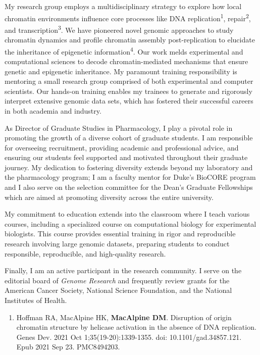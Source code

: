 \documentclass{update_nihbiosketch}
\begin{document}
\begin{statement}
\addtolength{\parskip}{1.5mm}
\noindent My research group employs a multidisciplinary strategy to explore how local chromatin environments influence core processes like DNA replication\textsuperscript{1}, repair\textsuperscript{2}, and transcription\textsuperscript{3}. We have pioneered novel genomic approaches to study chromatin dynamics and profile chromatin assembly post-replication to elucidate the inheritance of epigenetic information\textsuperscript{4}. Our work melds experimental and computational sciences to decode chromatin-mediated mechanisms that ensure genetic and epigenetic inheritance. My paramount training responsibility is mentoring a small research group comprised of both experimental and computer scientists. Our hands-on training enables my trainees to generate and rigorously interpret extensive genomic data sets, which has fostered their successful careers in both academia and industry.

\noindent As Director of Graduate Studies in Pharmacology, I play a pivotal role in promoting the growth of a diverse cohort of graduate students. I am responsible for overseeing recruitment, providing academic and professional advice, and ensuring our students feel supported and motivated throughout their graduate journey. My dedication to fostering diversity extends beyond my laboratory and the pharmacology program; I am a faculty mentor for Duke's  BioCORE program and I also serve on the selection committee for the Dean's Graduate Fellowships which are aimed at promoting diversity across the entire university.  

\noindent My commitment to education extends into the classroom where I teach various courses, including a specialized course on computational biology for experimental biologists. This course provides essential training in rigor and reproducible research involving large genomic datasets, preparing students to conduct responsible, reproducible, and high-quality research.

\noindent Finally, I am an active participant in the research community. I serve on the editorial board of \textit{Genome Research} and frequently review grants for the American Cancer Society, National Science Foundation, and the National Institutes of Health.  

\begin{enumerate}

\item Hoffman RA, MacAlpine HK, \textbf{MacAlpine DM}. Disruption of origin chromatin structure by helicase activation in the absence of DNA replication. Genes Dev. 2021 Oct 1;35(19-20):1339-1355. doi: 10.1101/gad.34857.121. Epub 2021 Sep 23. PMC8494203.


\end{enumerate}
\end{statement}
\end{document}
